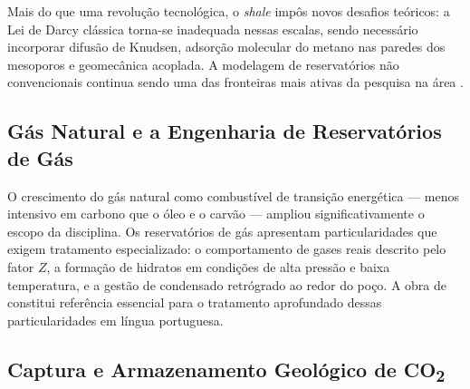 \documentclass[
  12pt,
  a4paper,
  oneside,
  brazilian,
  sumario=tradicional
]{abntex2}
\begin{document}
Mais do que uma revolução tecnológica, o \textit{shale} impôs novos
desafios teóricos: a Lei de Darcy clássica torna-se inadequada nessas
escalas, sendo necessário incorporar difusão de Knudsen, adsorção
molecular do metano nas paredes dos mesoporos e geomecânica acoplada.
A modelagem de reservatórios não convencionais continua sendo uma das
fronteiras mais ativas da pesquisa na área \cite{javadpour2009}.

\subsection{Gás Natural e a Engenharia de Reservatórios de Gás}

O crescimento do gás natural como combustível de transição energética
— menos intensivo em carbono que o óleo e o carvão — ampliou
significativamente o escopo da disciplina. Os reservatórios de gás
apresentam particularidades que exigem tratamento especializado:
o comportamento de gases reais descrito pelo fator $Z$, a formação de
hidratos em condições de alta pressão e baixa temperatura, e a gestão
de condensado retrógrado ao redor do poço. A obra de \cite{ramos2020}
constitui referência essencial para o tratamento aprofundado dessas
particularidades em língua portuguesa.

\subsection{\texorpdfstring{Captura e Armazenamento Geológico de CO\textsubscript{2}}{Captura e Armazenamento Geológico de CO2}}
\end{document}
